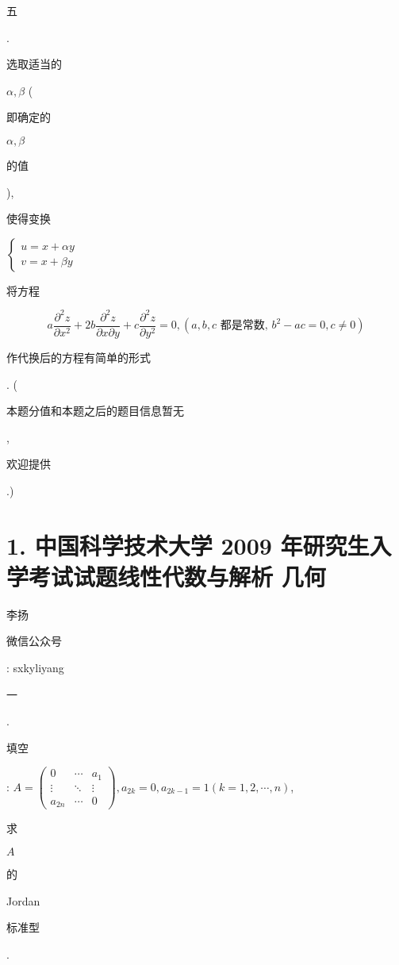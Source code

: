 \documentclass[10pt]{article}
\begin{document}
\begin{CJK}{UTF8}{mj}五\end{CJK}. \begin{CJK}{UTF8}{mj}选取适当的\end{CJK} $\alpha, \beta$ (\begin{CJK}{UTF8}{mj}即确定的\end{CJK} $\alpha, \beta$ \begin{CJK}{UTF8}{mj}的值\end{CJK}), \begin{CJK}{UTF8}{mj}使得变换\end{CJK} $\left\{\begin{array}{l}u=x+\alpha y \\ v=x+\beta y\end{array}\right.$ \begin{CJK}{UTF8}{mj}将方程\end{CJK}
$$
a \frac{\partial^{2} z}{\partial x^{2}}+2 b \frac{\partial^{2} z}{\partial x \partial y}+c \frac{\partial^{2} z}{\partial y^{2}}=0,\left(a, b, c \text { 都是常数, } b^{2}-a c=0, c \neq 0\right)
$$
\begin{CJK}{UTF8}{mj}作代换后的方程有简单的形式\end{CJK}. (\begin{CJK}{UTF8}{mj}本题分值和本题之后的题目信息暂无\end{CJK}, \begin{CJK}{UTF8}{mj}欢迎提供\end{CJK}.)

\section{1. 中国科学技术大学 2009 年研究生入学考试试题线性代数与解析 几何}
\begin{CJK}{UTF8}{mj}李扬\end{CJK}

\begin{CJK}{UTF8}{mj}微信公众号\end{CJK}: sxkyliyang

\begin{CJK}{UTF8}{mj}一\end{CJK}. \begin{CJK}{UTF8}{mj}填空\end{CJK}: $A=\left(\begin{array}{ccc}0 & \cdots & a_{1} \\ \vdots & \ddots & \vdots \\ a_{2 n} & \cdots & 0\end{array}\right), a_{2 k}=0, a_{2 k-1}=1(k=1,2, \cdots, n)$, \begin{CJK}{UTF8}{mj}求\end{CJK} $A$ \begin{CJK}{UTF8}{mj}的\end{CJK}Jordan \begin{CJK}{UTF8}{mj}标准型\end{CJK}.
\end{document}
